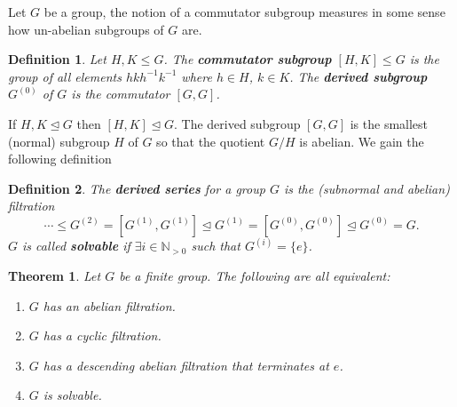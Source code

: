 \documentclass{report}
\providecommand{\N}{\mathbb{N}}
\newtheorem{theorem}{Theorem}
\newtheorem{defi}{Definition}
\begin{document}
\begin{singlespace}
\begin{enumerate}
  Let $G$ be a group, the notion of a commutator subgroup measures in some sense how un-abelian subgroups of $G$ are.
  \begin{defi}
    Let $H,K\leq G$. The \textbf{commutator subgroup} $[H,K]\leq G$ is the group of all elements $hkh^{-1}k^{-1}$ where $h\in H$, $k\in K$. The \textbf{derived subgroup} $G^{(0)}$ of $G$ is the commutator $[G,G]$.
  \end{defi}
  If $H,K\trianglelefteq G$ then $[H,K]\trianglelefteq G$. The derived subgroup $[G,G]$ is the smallest (normal) subgroup $H$ of $G$ so that the quotient $G/H$ is abelian. We gain the following definition
  \begin{defi}
    The \textbf{derived series} for a group $G$ is the (subnormal and abelian) filtration
    \[
      \cdots \leq G^{(2)}=[G^{(1)}, G^{(1)}]\trianglelefteq G^{(1)}=[G^{(0)},G^{(0)}]\trianglelefteq G^{(0)}=G.\]
    $G$ is called \textbf{solvable} if $\exists i\in \N_{>0}$ such that $G^{(i)}=\{e\}$.
  \end{defi}
  \begin{theorem}
    Let $G$ be a finite group. The following are all equivalent:
  \begin{enumerate}
    \item $G$ has an abelian filtration.
    \item $G$ has a cyclic filtration.
    \item $G$ has a descending abelian filtration that terminates at $e$.
    \item $G$ is solvable.
    \end{enumerate}
  \end{theorem}


\end{enumerate}
\end{singlespace}
\end{document}
